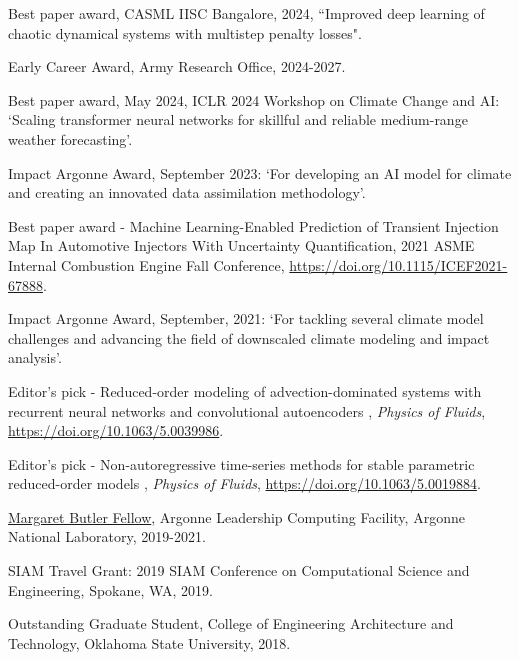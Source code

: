 \documentclass[letterpaper]{article}
\renewenvironment{itemize}{
  \begin{list}{}{
    \setlength{\leftmargin}{1.5em}
  }
}{
  \end{list}
}
\begin{document}
\begin{itemize}

\item Best paper award, CASML IISC Bangalore, 2024, ``Improved deep learning of chaotic dynamical systems with multistep penalty losses".

\item Early Career Award, Army Research Office, 2024-2027.

\item Best paper award, May 2024, ICLR 2024 Workshop on Climate Change and AI: `Scaling transformer neural networks for skillful and reliable medium-range weather forecasting'.

\item Impact Argonne Award, September 2023: `For developing an AI model for climate and creating an innovated data assimilation methodology'.

\item Best paper award - Machine Learning-Enabled Prediction of Transient Injection Map In Automotive Injectors With Uncertainty Quantification, 2021 ASME Internal Combustion Engine Fall Conference, \url{https://doi.org/10.1115/ICEF2021-67888}.

\item Impact Argonne Award, September, 2021: `For tackling several climate model challenges and advancing the field of downscaled climate modeling and impact analysis'.

\item Editor's pick - Reduced-order modeling of advection-dominated systems with recurrent neural networks and convolutional autoencoders , {\it Physics of Fluids}, \url{https://doi.org/10.1063/5.0039986}.

\item Editor's pick - Non-autoregressive time-series methods for stable parametric reduced-order models , {\it Physics of Fluids}, \url{https://doi.org/10.1063/5.0019884}.

\item \href{https://www.alcf.anl.gov/margaret-butler-fellowship-computational-science}{Margaret Butler Fellow}, Argonne Leadership Computing Facility, Argonne National Laboratory, 2019-2021.

\item SIAM Travel Grant: 2019 SIAM Conference on Computational Science and Engineering, Spokane, WA, 2019.

\item Outstanding Graduate Student, College of Engineering Architecture and Technology, Oklahoma State University, 2018.


\end{itemize}
\end{document}
